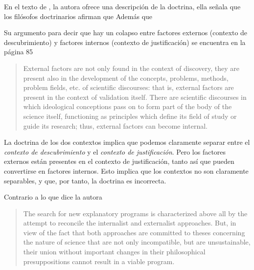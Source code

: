 \noindent En el texto de \textcite[p.75]{Yturbe1995}, la autora ofrece una descripción de la doctrina, ella señala que los filósofos doctrinarios afirman que 
Además que 


Su argumento para decir que hay un colapso entre factores externos (contexto de descubrimiento) y factores internos (contexto de justificación) se encuentra en la página 85

\begin{quote}

	External factors are not only found in the context of discovery, they are present also in the development of the concepts, problems, methods, problem fields, etc. of scientific discourses: that is, external factors are present in the context of validation itself.
	There are scientific discourses in which ideological conceptions pass on to form part of the body of the science itself, functioning as principles which define its field of study or guide its research; thus, external factors can become internal.

\end{quote}

La doctrina de los dos contextos implica que podemos claramente separar entre el \emph{contexto de descubrimiento} y el \emph{contexto de justificación}.
Pero los factores externos están presentes en el contexto de justificación, tanto así que pueden convertirse en factores internos.
Esto implica que los contextos no son claramente separables, y que, por tanto, la doctrina es incorrecta.

Contrario a lo que dice la autora

\begin{quote}
	The search for new explanatory programs is characterized above all by the attempt to reconcile the internalist and externalist approaches. But, in view of the fact that both approaches are committed to theses concerning the nature of science that are not only incompatible, but are unsustainable, their union without important changes in their philosophical presuppositions cannot result in a viable program. \parencite[p. 79]{Yturbe1995}
\end{quote}

